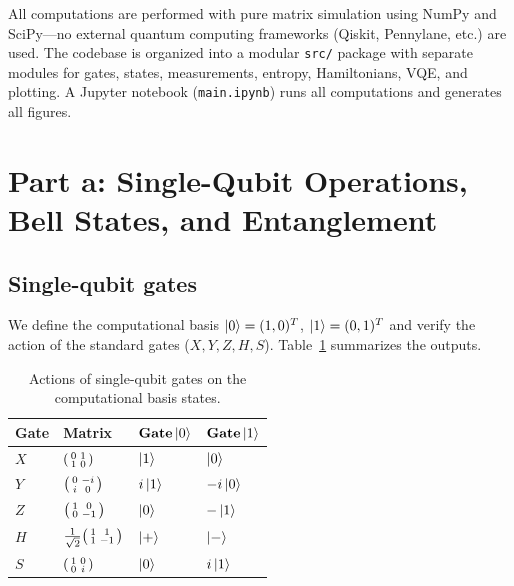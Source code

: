 \documentclass[11pt]{article}
\begin{document}
All computations are performed with pure matrix simulation using NumPy and SciPy---no external quantum computing frameworks (Qiskit, Pennylane, etc.) are used. The codebase is organized into a modular \texttt{src/} package with separate modules for gates, states, measurements, entropy, Hamiltonians, VQE, and plotting. A Jupyter notebook (\texttt{main.ipynb}) runs all computations and generates all figures.

\section{Part a: Single-Qubit Operations, Bell States, and Entanglement}

\subsection{Single-qubit gates}

We define the computational basis $\ket{0} = (1, 0)^T$, $\ket{1} = (0, 1)^T$ and verify the action of the standard gates ($X, Y, Z, H, S$). Table~\ref{tab:gates} summarizes the outputs.

\begin{table}[h!]
\centering
\begin{tabular}{@{}llll@{}}
\toprule
\textbf{Gate} & \textbf{Matrix} & $\textbf{Gate}\ket{0}$ & $\textbf{Gate}\ket{1}$ \\ \midrule
$X$ & $\begin{psmallmatrix}0&1\\1&0\end{psmallmatrix}$ & $\ket{1}$ & $\ket{0}$ \\[4pt]
$Y$ & $\begin{psmallmatrix}0&-i\\i&0\end{psmallmatrix}$ & $i\ket{1}$ & $-i\ket{0}$ \\[4pt]
$Z$ & $\begin{psmallmatrix}1&0\\0&-1\end{psmallmatrix}$ & $\ket{0}$ & $-\ket{1}$ \\[4pt]
$H$ & $\frac{1}{\sqrt{2}}\begin{psmallmatrix}1&1\\1&-1\end{psmallmatrix}$ & $\ket{+}$ & $\ket{-}$ \\[4pt]
$S$ & $\begin{psmallmatrix}1&0\\0&i\end{psmallmatrix}$ & $\ket{0}$ & $i\ket{1}$ \\ \bottomrule
\end{tabular}
\caption{Actions of single-qubit gates on the computational basis states.}
\label{tab:gates}
\end{table}
\end{document}
